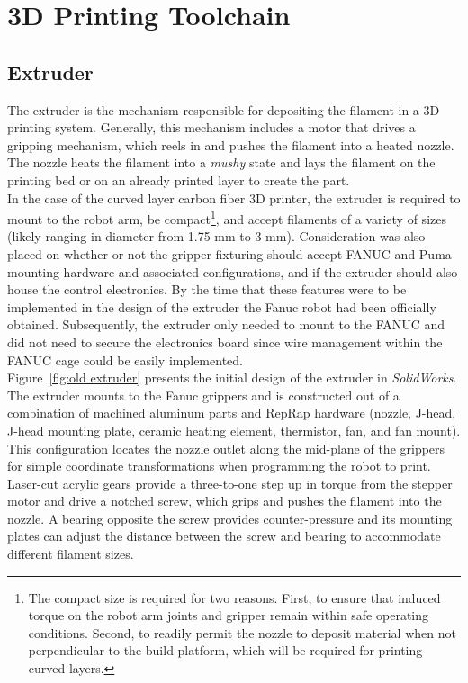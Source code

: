 \section{3D Printing Toolchain}

\subsection{Extruder}

\indent

The extruder is the mechanism responsible for depositing the filament in a 3D printing system. Generally, this mechanism includes a motor that drives a gripping mechanism, which reels in and pushes the filament into a heated nozzle. The nozzle heats the filament into a \emph{mushy} state and lays the filament on the printing bed or on an already printed layer to create the part.\\

In the case of the curved layer carbon fiber 3D printer, the extruder is required to mount to the robot arm, be compact\footnote{The compact size is required for two reasons. First, to ensure that induced torque on the robot arm joints and gripper remain within safe operating conditions. Second, to readily permit the nozzle to deposit material when not perpendicular to the build platform, which will be required for printing curved layers.}, and accept filaments of a variety of sizes (likely ranging in diameter from 1.75 mm to 3 mm). Consideration was also placed on whether or not the gripper fixturing should accept FANUC and Puma mounting hardware and associated configurations, and if the extruder should also house the control electronics. By the time that these features were to be implemented in the design of the extruder the Fanuc robot had been officially obtained. Subsequently, the extruder only needed to mount to the FANUC and did not need to secure the electronics board since wire management within the FANUC cage could be easily implemented.\\

Figure~\ref{fig:old extruder} presents the initial design of the extruder in \emph{SolidWorks}. The extruder mounts to the Fanuc grippers and is constructed out of a combination of machined aluminum parts and RepRap hardware (nozzle, J-head, J-head mounting plate, ceramic heating element, thermistor, fan, and fan mount). This configuration locates the nozzle outlet along the mid-plane of the grippers for simple coordinate transformations when programming the robot to print. Laser-cut acrylic gears provide a three-to-one step up in torque from the stepper motor and drive a notched screw, which grips and pushes the filament into the nozzle. A bearing opposite the screw provides counter-pressure and its mounting plates can adjust the distance between the screw and bearing to accommodate different filament sizes.\\

